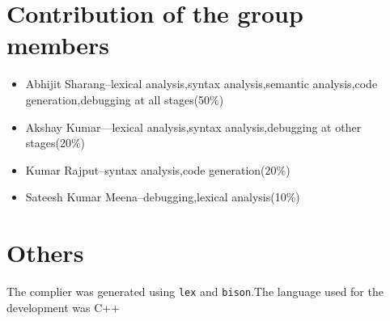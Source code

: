 \documentclass{report}
\begin{document}
\section*{Contribution of the group members}
\begin{itemize}
\item Abhijit Sharang--lexical analysis,syntax analysis,semantic analysis,code generation,debugging at all stages(50\%)
\item Akshay Kumar---lexical analysis,syntax analysis,debugging at other stages(20\%)
\item Kumar Rajput--syntax analysis,code generation(20\%)
\item Sateesh Kumar Meena--debugging,lexical analysis(10\%)
\end{itemize}
\section*{Others}
The complier was generated using \texttt{lex} and \texttt{bison}.The language used for the development was C++
\end{document}
